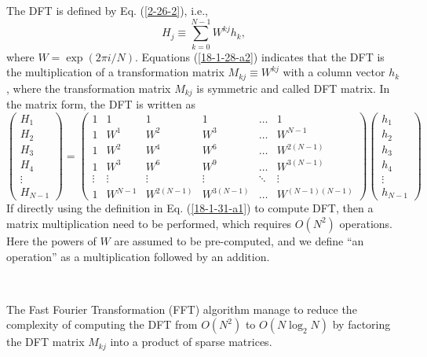 \documentclass{article}
\begin{document}
The DFT is defined by Eq. (\ref{2-26-2}), i.e.,
\begin{equation}
  \label{18-1-28-a2} H_j \equiv \sum_{k = 0}^{N - 1} W^{k j} h_k,
\end{equation}
where $W = \exp (2 \pi i / N)$. Equations (\ref{18-1-28-a2}) indicates that
the DFT is the multiplication of a transformation matrix $M_{k j} \equiv W^{k
j}$ with a column vector $h_k$, where the transformation matrix $M_{k j}$ is
symmetric and called DFT matrix. In the matrix form, the DFT is written as
\begin{equation}
  \label{18-1-31-a1} \left(\begin{array}{c}
    H_1\\
    H_2\\
    H_3\\
    H_4\\
    \vdots\\
    H_{N - 1}
  \end{array}\right) = \left(\begin{array}{cccccc}
    1 & 1 & 1 & 1 & \ldots & 1\\
    1 & W^1 & W^2 & W^3 & \ldots & W^{N - 1}\\
    1 & W^2 & W^4 & W^6 & \ldots & W^{2 (N - 1)}\\
    1 & W^3 & W^6 & W^9 & \ldots & W^{3 (N - 1)}\\
    \vdots & \vdots & \vdots & \vdots & \ddots & \vdots\\
    1 & W^{N - 1} & W^{2 (N - 1)} & W^{3 (N - 1)} & \ldots & W^{(N - 1) (N -
    1)}
  \end{array}\right) \left(\begin{array}{c}
    h_1\\
    h_2\\
    h_3\\
    h_4\\
    \vdots\\
    h_{N - 1}
  \end{array}\right)
\end{equation}
If directly using the definition in Eq. (\ref{18-1-31-a1}) to compute DFT,
then a matrix multiplication need to be performed, which requires $O (N^2)$
operations. Here the powers of $W$ are assumed to be pre-computed, and we
define ``an operation'' as a multiplication followed by an addition.

\

The Fast Fourier Transformation (FFT) algorithm manage to reduce the
complexity of computing the DFT from $O (N^2)$ to $O (N \log_2 N)$ by
factoring the DFT matrix $M_{k j}$ into a product of sparse matrices.
\end{document}
